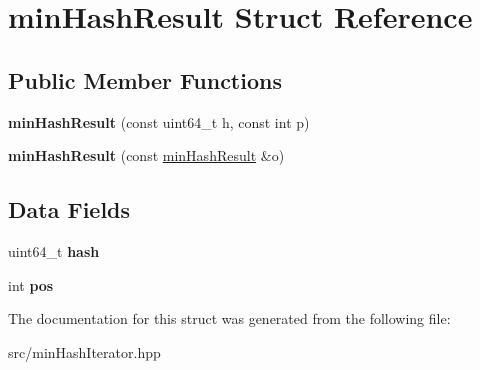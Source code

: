 \hypertarget{structminHashResult}{}\section{min\+Hash\+Result Struct Reference}
\label{structminHashResult}
\subsection*{Public Member Functions}
\begin{DoxyCompactItemize}
\item 
\mbox{\label{structminHashResult_a6cdcc54219d220eed780a1fe874cd2c3}} 
{\bfseries min\+Hash\+Result} (const uint64\+\_\+t h, const int p)
\item 
\mbox{\label{structminHashResult_a0ce8255682b9b5c6ae95fb95d089e4f7}} 
{\bfseries min\+Hash\+Result} (const \hyperlink{structminHashResult}{min\+Hash\+Result} \&o)
\end{DoxyCompactItemize}
\subsection*{Data Fields}
\begin{DoxyCompactItemize}
\item 
\mbox{\label{structminHashResult_a17316a587f02d8f0730015d5afbef99c}} 
uint64\+\_\+t {\bfseries hash}
\item 
\mbox{\label{structminHashResult_ac77e0477b3285e72f22679d7720e98c7}} 
int {\bfseries pos}
\end{DoxyCompactItemize}


The documentation for this struct was generated from the following file\+:\begin{DoxyCompactItemize}
\item 
src/min\+Hash\+Iterator.\+hpp\end{DoxyCompactItemize}
